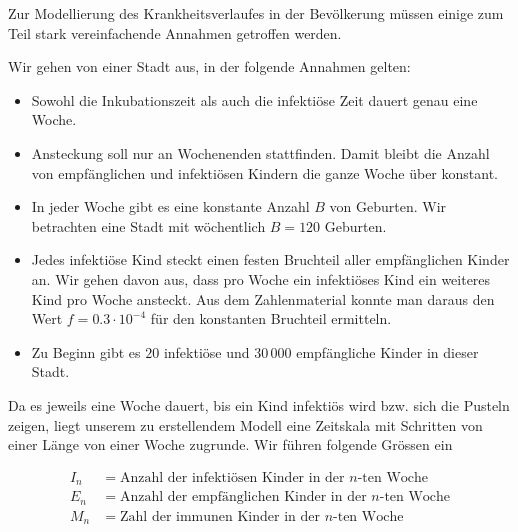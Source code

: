 \documentclass[%
<<<<<<< Updated upstream
11pt,%
twoside,%
titlepage,%
german,%
headsepline%
]{scrartcl}
\begin{document}
\begin{center}
\end{center}

Zur Modellierung des Krankheitsverlaufes in der Bevölkerung müssen einige zum Teil stark vereinfachende Annahmen getroffen werden.

Wir gehen von einer Stadt aus, in der folgende Annahmen gelten:

\begin{itemize}
\item Sowohl die Inkubationszeit als auch die infektiöse Zeit dauert genau eine Woche.
\item Ansteckung soll nur an Wochenenden stattfinden. Damit bleibt die Anzahl von empfänglichen und infektiösen Kindern die ganze Woche über konstant.
\item In jeder Woche gibt es eine konstante Anzahl $B$ von Geburten. Wir betrachten eine Stadt mit wöchentlich $B=120$ Geburten.
\item Jedes infektiöse Kind steckt einen festen Bruchteil aller empfänglichen Kinder an. Wir gehen davon aus, dass pro Woche ein infektiöses Kind ein weiteres Kind pro Woche ansteckt. Aus dem Zahlenmaterial konnte man daraus den Wert $f=0.3\cdot10^{-4}$ für den konstanten Bruchteil ermitteln.
\item Zu Beginn gibt es $20$ infektiöse und $30\,000$ empfängliche Kinder in dieser
Stadt.
\end{itemize}

Da es jeweils eine Woche dauert, bis ein Kind infektiös wird bzw. sich die Pusteln zeigen, liegt unserem zu erstellendem Modell eine Zeitskala mit Schritten von einer Länge von einer Woche zugrunde. Wir führen folgende Grössen ein

\begin{align*}
I_n &= \text{Anzahl der infektiösen Kinder in der $n$-ten Woche}\\
E_n &= \text{Anzahl der empfänglichen Kinder in der $n$-ten Woche}\\
M_n &= \text{Zahl der immunen Kinder in der $n$-ten Woche}\\
\end{align*}
\end{document}
